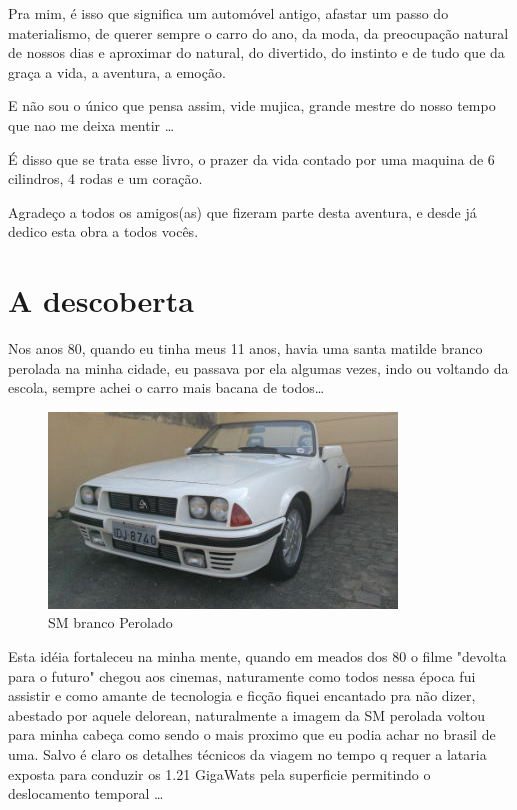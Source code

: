 \documentclass[a4paper]{report}
\begin{document}
Pra mim, \'e isso que significa um autom\'ovel antigo, afastar um passo do materialismo, de querer sempre o carro do ano, da moda, da preocupa\c{c}\~ao natural de nossos dias
e aproximar do natural, do divertido, do instinto e de tudo que da gra\c{c}a a vida, a aventura, a emo\c{c}\~ao.

E n\~ao sou o \'unico que pensa assim, vide mujica, grande mestre do nosso tempo que nao me deixa mentir \dots

\'E disso que se trata esse livro, o prazer da vida contado por uma maquina de 6 cilindros, 4 rodas e um cora\c{c}\~ao.

Agrade\c{c}o a todos os amigos(as) que fizeram parte desta aventura, e desde j\'a dedico esta obra a todos voc\^es.

\clearpage

\section*{A descoberta}
Nos anos 80, quando eu tinha meus 11 anos, havia uma santa matilde branco perolada na minha cidade,
eu passava por ela algumas vezes, indo ou voltando da escola, sempre achei o carro mais bacana de todos\dots

\begin{figure}[!htb]
\centering
\includegraphics{sm_bco_per}
\caption{SM branco Perolado}
\label{sm_bco}
\end{figure}

Esta id\'eia fortaleceu na minha mente, quando em meados dos 80 o filme "devolta para o futuro" chegou aos cinemas, naturamente como todos nessa \'epoca
fui assistir e como amante de tecnologia e fic\c{c}\~ao fiquei encantado pra n\~ao dizer, abestado por aquele delorean, naturalmente a imagem da SM perolada
voltou para minha cabe\c{c}a como sendo o mais proximo que eu podia achar no brasil de uma. Salvo \'e claro os detalhes t\'ecnicos da viagem no tempo q requer
a lataria exposta para conduzir os 1.21 GigaWats pela superficie permitindo o deslocamento temporal \dots
\end{document}
